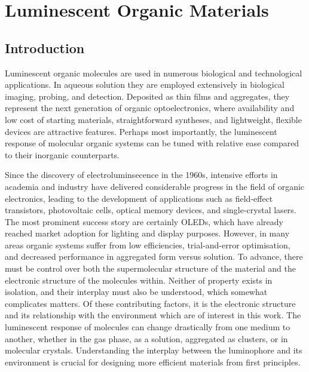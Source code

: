 \chapter{Luminescent Organic Materials}
\label{chapter: luminscent organic materials}
\section{Introduction}\label{section: lom introduction}
Luminescent organic molecules are used in numerous biological and technological applications. In aqueous solution they are employed extensively in biological imaging, probing, and detection. Deposited as thin films and aggregates, they represent the next generation of organic optoelectronics, where availability and low cost of starting materials, straightforward syntheses, and lightweight, flexible devices are attractive features. Perhaps most importantly, the luminescent response of molecular organic systems can be tuned with relative ease compared to their inorganic counterparts.

Since the discovery of electroluminsecence in the 1960s, intensive efforts in academia and industry have delivered considerable progress in the field of organic electronics, leading to  the development of applications such as field-effect transistors, photovoltaic cells, optical memory devices, and single-crystal lasers.\cite{Ostroverkhova2016} The most prominent success story are certainly \acp{OLED}, which have already reached market adoption for lighting and display purposes. However, in many areas organic systems suffer from low efficiencies, trial-and-error optimisation, and decreased performance in aggregated form versus solution. 
To advance, there must be control over both the supermolecular structure of the material and the electronic structure of the  molecules within. Neither of property exists in isolation, and their interplay must also be understood, which somewhat complicates matters. Of these contributing factors, it is the electronic structure and its relationship with the environment which are of interest in this work. The luminescent response of molecules can change drastically from one medium to another, whether in the gas phase, as a solution, aggregated as clusters, or in molecular crystals. Understanding the interplay between the luminophore and its environment is crucial for designing more efficient materials from first principles. 

